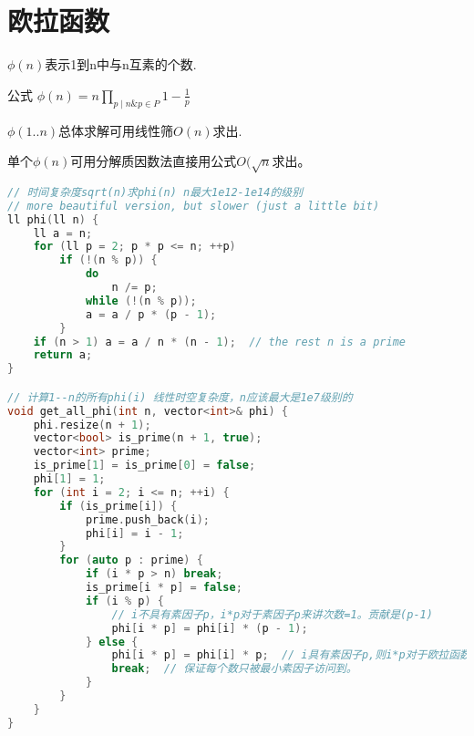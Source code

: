 \section{欧拉函数}
	\par $\phi(n)$表示1到n中与n互素的个数.
	\par 公式 $\phi(n)=n\prod\limits_{p \mid n \& p \in P } 1-\frac{1}{p}$
	\par $\phi(1..n)$总体求解可用线性筛$O(n)$求出.
	\par 单个$\phi(n)$可用分解质因数法直接用公式$O(\sqrt{n}$求出。
	
\begin{lstlisting}[language={c++}]
// 时间复杂度sqrt(n)求phi(n) n最大1e12-1e14的级别
// more beautiful version, but slower (just a little bit)
ll phi(ll n) {
	ll a = n;
	for (ll p = 2; p * p <= n; ++p)
		if (!(n % p)) {
			do
				n /= p;
			while (!(n % p));
			a = a / p * (p - 1);
		}
	if (n > 1) a = a / n * (n - 1);  // the rest n is a prime
	return a;
}

// 计算1--n的所有phi(i) 线性时空复杂度，n应该最大是1e7级别的
void get_all_phi(int n, vector<int>& phi) {
	phi.resize(n + 1);
	vector<bool> is_prime(n + 1, true);
	vector<int> prime;
	is_prime[1] = is_prime[0] = false;
	phi[1] = 1;
	for (int i = 2; i <= n; ++i) {
		if (is_prime[i]) {
			prime.push_back(i);
			phi[i] = i - 1;
		}
		for (auto p : prime) {
			if (i * p > n) break;
			is_prime[i * p] = false;
			if (i % p) {
				// i不具有素因子p，i*p对于素因子p来讲次数=1。贡献是(p-1)
				phi[i * p] = phi[i] * (p - 1);
			} else {
				phi[i * p] = phi[i] * p;  // i具有素因子p,则i*p对于欧拉函数值来讲乘以p
				break;  // 保证每个数只被最小素因子访问到。
			}
		}
	}
}
\end{lstlisting}